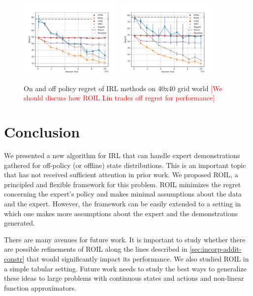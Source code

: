 \documentclass[10pt]{article}
\theoremstyle{plain}
\theoremstyle{remark}
\newcommand{\gersi}[1]{\textcolor{red}{[#1]}}
\begin{document}
\begin{figure}
	\centering
	\includegraphics[width=0.45\textwidth]{../src/plots/regrets/40x40_gridworld_on_policy_regret_regrets.pdf}
	\includegraphics[width=0.45\textwidth]{../src/plots/regrets/40x40_gridworld_off_policy_regret_regrets.pdf}
	\caption{On and off policy regret of IRL methods on 40x40 grid world \gersi{We should discuss how ROIL Lin trades off regret for performance}}
	\label{fig:grid-40}
\end{figure}

\section{Conclusion}

We presented a new algorithm for IRL that can handle expert demonstrations gathered for off-policy (or offline) state distributions. This is an important topic that has not received sufficient attention in prior work. We proposed ROIL, a principled and flexible framework for this problem. ROIL minimizes the regret concerning the expert's policy and makes minimal assumptions about the data and the expert. However, the framework can be easily extended to a setting in which one makes more assumptions about the expert and the demonstrations generated. 

There are many avenues for future work. It is important to study whether there are possible refinements of ROIL along the lines described in \cref{sec:incorp-addit-constr} that would significantly impact its performance. We also studied ROIL in a simple tabular setting. Future work needs to study the best ways to generalize these ideas to large problems with continuous states and actions and non-linear function approximators. 
\end{document}
